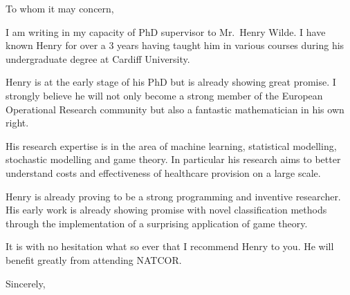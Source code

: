 \documentclass[11pt]{letter}
\begin{document}
\signature{Vincent Knight \\ Senior Lecturer of Mathematics}

\begin{letter}{}

\opening{To whom it may concern,}

I am writing in my capacity of PhD supervisor to Mr.\ Henry Wilde.  I
have known Henry for over a 3 years having taught him in various courses during 
his undergraduate degree at Cardiff University.

Henry is at the early stage of his PhD but is already showing great promise.
I strongly believe he will not only become a strong member of the
European Operational Research community but also a fantastic mathematician in
his own right.

His research expertise is in the area of machine learning, statistical
modelling, stochastic modelling and game theory. In particular his research aims
to better understand costs and effectiveness of healthcare provision on a large
scale.

Henry is already proving to be a strong programming and inventive researcher.
His early work is already showing promise with novel classification methods
through the implementation of a surprising application of game theory.

It is with no hesitation what so ever that I recommend Henry to you. He
will benefit greatly from attending NATCOR.

\closing{Sincerely,}

\end{letter}
\end{document}
